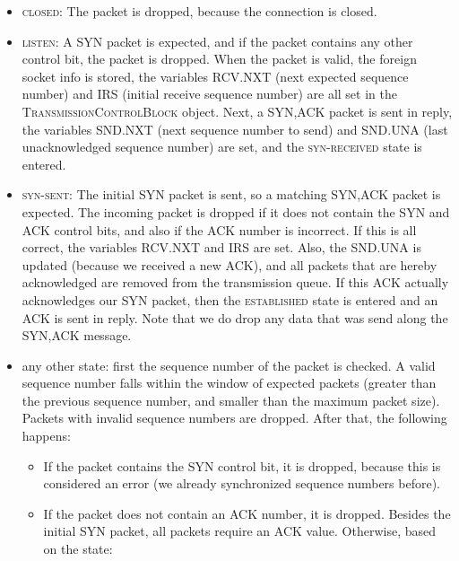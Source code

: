 \documentclass{hitec}
\newcommand{\classname}[1]{\textsc{#1}}
\newcommand{\state}[1]{\textsc{#1}}
\begin{document}
\begin{itemize}
  \item \state{closed}: The packet is dropped, because the connection is closed.
  
  \item \state{listen}: A SYN packet is expected, and if the packet contains any other control bit, the packet is dropped. When the packet is valid, the foreign socket info is stored, the variables RCV.NXT (next expected sequence number) and IRS (initial receive sequence number) are all set in the \classname{TransmissionControlBlock} object. Next, a SYN,ACK packet is sent in reply, the variables SND.NXT (next sequence number to send) and SND.UNA (last unacknowledged sequence number) are set, and the \state{syn-received} state is entered.
  
  \item \state{syn-sent}: The initial SYN packet is sent, so a matching SYN,ACK packet is expected. The incoming packet is dropped if it does not contain the SYN and ACK control bits, and also if the ACK number is incorrect. If this is all correct, the variables RCV.NXT and IRS are set. Also, the SND.UNA is updated (because we received a new ACK), and all packets that are hereby acknowledged are removed from the transmission queue. If this ACK actually acknowledges our SYN packet, then the \state{established} state is entered and an ACK is sent in reply. Note that we do drop any data that was send along the SYN,ACK message.
  
  \item any other state: first the sequence number of the packet is checked. A valid sequence number falls within the window of expected packets (greater than the previous sequence number, and smaller than the maximum packet size). Packets with invalid sequence numbers are dropped. After that, the following happens: 
  
  \begin{itemize}
    \item If the packet contains the SYN control bit, it is dropped, because this is considered an error (we already synchronized sequence numbers before). 
    \item If the packet does not contain an ACK number, it is dropped. Besides the initial SYN packet, all packets require an ACK value. Otherwise, based on the state:
    

\end{itemize}
\end{itemize}
\end{document}
